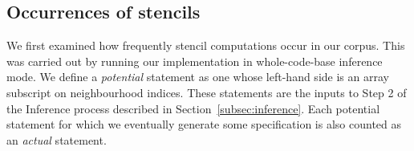 \documentclass[9pt]{sigplanconf}
\theoremstyle{definition}
\begin{document}





\subsection{Occurrences of stencils}

We first examined how frequently stencil computations occur in our
corpus. This was carried out by running our implementation in 
whole-code-base inference mode. We define a \emph{potential} statement as one whose left-hand
side is an array subscript on neighbourhood indices. These statements
are the inputs to Step 2 of the Inference process described in 
Section~\ref{subsec:inference}. Each potential statement for which we
eventually generate some specification is also counted as
an \emph{actual} statement.
\end{document}
